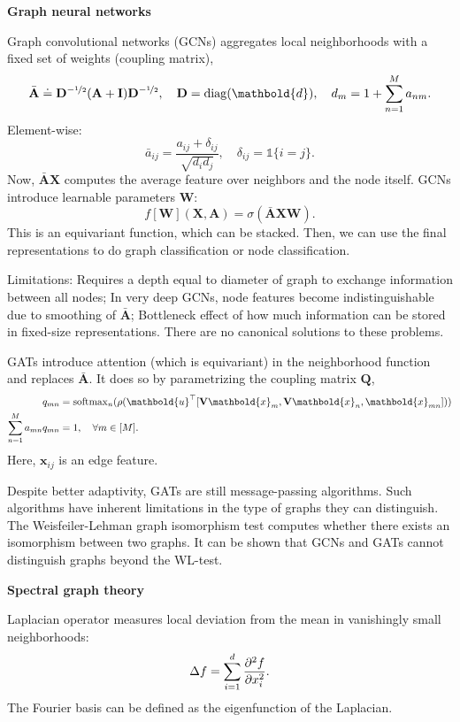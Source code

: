 \documentclass[10pt]{article}
\newenvironment{topic}[1]
{\textbf{\sffamily \footnotesize \colorbox{black}{\rlap{\textbf{\textcolor{white}{#1}}}\hspace{\linewidth}\hspace{-2\fboxsep}}}}
{}
\newenvironment{subtopic}[1]
{\vspace{0.1cm} \begin{center}\textbf{\footnotesize \sffamily #1}\end{center}}
{}
\renewcommand{\mat}[1]{\ensuremath{\mathbf{#1}}}
\renewcommand{\vec}[1]{\ensuremath{\mathbold{#1}}}
\begin{document}
\begin{multicols*}{3}
\begin{topic}{Geometric deep learning}
\begin{subtopic}{Graph neural networks}
            Graph convolutional networks (GCNs) aggregates local neighborhoods with a fixed set of weights
            (coupling matrix), \[
                \bar{\mat{A}} \doteq \mat{D}^{-\nicefrac{1}{2}} (\mat{A} + \mat{I}) \mat{D}^{-\nicefrac{1}{2}}, \quad \mat{D} = \mathrm{diag}(\vec{d}), \quad d_m = 1 + \sum_{n=1}^{M} a_{nm}.
            \]
            Element-wise: \[
                \bar{a}_{ij} = \frac{a_{ij} + \delta_{ij}}{\sqrt{d_i d_j}}, \quad \delta_{ij} = \mathbb{1}\{ i = j \}.
            \]
            Now, $\bar{\mat{A}}\mat{X}$ computes the average feature over neighbors and the node itself.
            GCNs introduce learnable parameters $\mat{W}$: \[
                f[\mat{W}](\mat{X}, \mat{A}) = \sigma(\bar{\mat{A}} \mat{X} \mat{W}).
            \]
            This is an equivariant function, which can be stacked. Then, we can use the final representations
            to do graph classification or node classification.

            Limitations: Requires a depth equal to diameter of graph to exchange information between all nodes;
            In very deep GCNs, node features become indistinguishable due to smoothing of $\bar{\mat{A}}$;
            Bottleneck effect of how much information can be stored in fixed-size representations. There are no
            canonical solutions to these problems.

            GATs introduce attention (which is equivariant) in the neighborhood function and replaces
            $\bar{\mat{A}}$. It does so by parametrizing the coupling matrix $\mat{Q}$,
            \begin{align*}
                q_{mn}                       & = \mathrm{softmax}_n ( \rho(\transpose{\vec{u}} [\mat{V}\vec{x}_m, \mat{V}\vec{x}_n, \vec{x}_{mn}]) ) \\
                \sum_{n=1}^{M} a_{mn} q_{mn} & = 1, \quad \forall m \in [M].
            \end{align*}
            Here, $\vec{x}_{ij}$ is an edge feature.

            Despite better adaptivity, GATs are still message-passing algorithms. Such algorithms have inherent
            limitations in the type of graphs they can distinguish. The Weisfeiler-Lehman graph isomorphism
            test computes whether there exists an isomorphism between two graphs. It can be shown that GCNs and
            GATs cannot distinguish graphs beyond the WL-test.
        \end{subtopic}

        \begin{subtopic}{Spectral graph theory}
            Laplacian operator measures local deviation from the mean in vanishingly small neighborhoods: \[
                \Delta f = \sum_{i=1}^{d} \pdv[order=2]{f}{x_i}.
            \]
            The Fourier basis can be defined as the eigenfunction of the Laplacian.


\end{subtopic}
\end{topic}
\end{multicols*}
\end{document}
